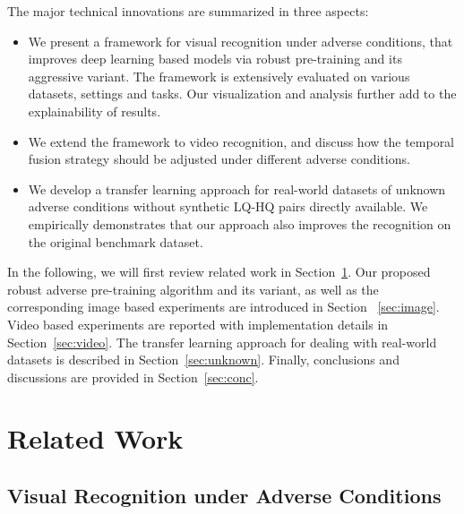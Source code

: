 \documentclass[10pt,twocolumn,twoside]{IEEEtran} %
\begin{document}
The major technical innovations are summarized in three aspects:
\begin{itemize}
	\item We present a framework for visual recognition under adverse conditions, that improves deep learning based models via robust pre-training and its aggressive variant. The framework is extensively evaluated on various datasets, settings and tasks. Our visualization and analysis further add to the explainability of results.
	\item We extend the framework to video recognition, and discuss how the temporal fusion strategy should be adjusted under different adverse conditions. 
	\item We develop a transfer learning approach for real-world datasets of unknown adverse conditions without synthetic LQ-HQ pairs directly available. We empirically demonstrates that our approach also improves the recognition on the original benchmark dataset. 
\end{itemize}%

In the following, we will first review related work in Section~\ref{sec:related}.
Our proposed robust adverse pre-training algorithm and its variant, as well as the corresponding image based experiments are introduced in Section ~\ref{sec:image}.
Video based experiments are reported with implementation details in Section~\ref{sec:video}.
The transfer learning approach for dealing with real-world datasets is described in Section~\ref{sec:unknown}.
Finally, conclusions and discussions are provided in Section~\ref{sec:conc}.
\section{Related Work}\label{sec:related}\subsection{Visual Recognition under Adverse Conditions}
\end{document}
